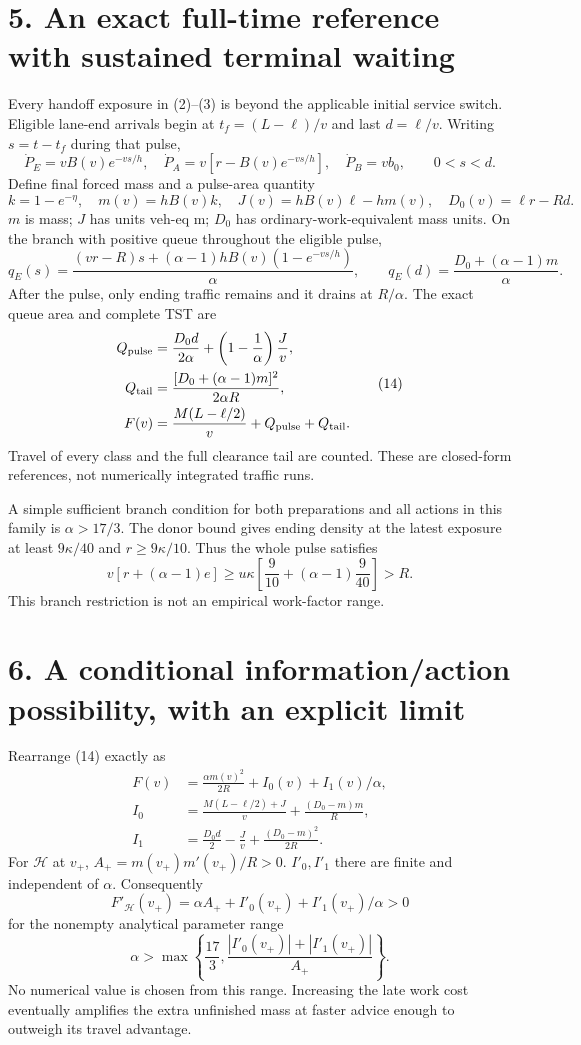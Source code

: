 \documentclass[11pt,a4paper]{article}
\begin{document}
\section*{5. An exact full-time reference with sustained terminal waiting}
Every handoff exposure in (2)--(3) is beyond the applicable initial service
switch. Eligible lane-end arrivals begin at $t_f=(L-\ell)/v$ and last
$d=\ell/v$. Writing $s=t-t_f$ during that pulse,
\[
 \dot P_E=vB(v)e^{-vs/h},\quad
 \dot P_A=v[r-B(v)e^{-vs/h}],\quad
 \dot P_B=vb_0,\qquad 0<s<d.
 \tag{11}
\]
Define final forced mass and a pulse-area quantity
\[
 k=1-e^{-\eta},\quad m(v)=hB(v)k,\quad
 J(v)=hB(v)\ell-hm(v),\quad D_0(v)=\ell r-Rd.
 \tag{12}
\]
$m$ is mass; $J$ has units veh-eq m; $D_0$ has ordinary-work-equivalent
mass units. On the branch with positive queue throughout the eligible pulse,
\[
 q_E(s)=\frac{(vr-R)s+(\alpha-1)hB(v)(1-e^{-vs/h})}{\alpha},
 \qquad q_E(d)=\frac{D_0+(\alpha-1)m}{\alpha}.
 \tag{13}
\]
After the pulse, only ending traffic remains and it drains at $R/\alpha$.
The exact queue area and complete TST are
\[
 \begin{split}
 Q_{\rm pulse}&=\frac{D_0d}{2\alpha}
                    +\left(1-\frac1\alpha\right)\frac Jv,\\
 Q_{\rm tail}&=\frac{[D_0+(\alpha-1)m]^2}{2\alpha R},\\
 F(v)&=\frac{M(L-\ell/2)}v+Q_{\rm pulse}+Q_{\rm tail}.
 \end{split}
 \tag{14}
\]
Travel of every class and the full clearance tail are counted.
These are closed-form references, not numerically integrated traffic runs.

A simple sufficient branch condition for both preparations and all actions
in this family is $\alpha>17/3$. The donor bound gives ending density at
the latest exposure at least $9\kappa/40$ and $r\geq9\kappa/10$.
Thus the whole pulse satisfies
\[
 v[r+(\alpha-1)e]\geq
 u\kappa\left[\frac9{10}+(\alpha-1)\frac9{40}\right]>R .
 \tag{15}
\]
This branch restriction is not an empirical work-factor range.

\section*{6. A conditional information/action possibility, with an explicit limit}
Rearrange (14) exactly as
\[
 \begin{split}
 F(v)&=\frac{\alpha m(v)^2}{2R}+I_0(v)+I_1(v)/\alpha,\\
 I_0&=\frac{M(L-\ell/2)+J}{v}+\frac{(D_0-m)m}{R},\\
 I_1&=\frac{D_0d}{2}-\frac Jv+\frac{(D_0-m)^2}{2R}.
 \end{split}
 \tag{16}
\]
For $\mathcal H$ at $v_+$, $A_+=m(v_+)m'(v_+)/R>0$.
$I'_0,I'_1$ there are finite and independent of $\alpha$.
Consequently
\[
 F'_{\mathcal H}(v_+)=\alpha A_+
       +I'_0(v_+)+I'_1(v_+)/\alpha>0
 \tag{17}
\]
for the nonempty analytical parameter range
\[
 \alpha>\max\left\{\frac{17}{3},
       \frac{|I'_0(v_+)|+|I'_1(v_+)|}{A_+}\right\}.
 \tag{18}
\]
No numerical value is chosen from this range. Increasing the late work
cost eventually amplifies the extra unfinished mass at faster advice enough
to outweigh its travel advantage.
\end{document}

